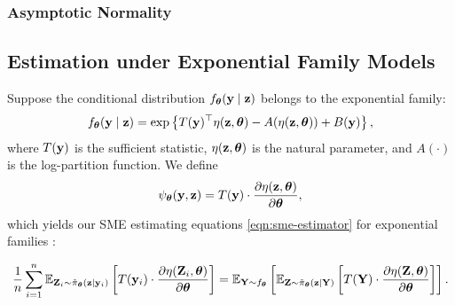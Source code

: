 \documentclass[twoside,11pt]{article}
\begin{document}
\subsubsection{Asymptotic Normality}

\subsection{Estimation under Exponential Family Models}
\label{sct:exponential-family}

Suppose the conditional distribution \( f_{\bm{\theta}}({\bf y} \mid {\bf z}) \) belongs to the exponential family:
\[
f_{\bm{\theta}}({\bf y} \mid {\bf z}) = \exp\left\{ T({\bf y})^\top \eta({\bf z}, {\bm{\theta}}) - A(\eta({\bf z}, {\bm{\theta}})) + B({\bf y}) \right\},
\]
where \( T({\bf y}) \) is the sufficient statistic, \( \eta({\bf z}, {\bm{\theta}}) \) is the natural parameter, and \( A(\cdot) \) is the log-partition function. We define
\begin{equation}
\psi_{\bm{\theta}}({\bf y}, {\bf z}) = T({\bf y}) \cdot \frac{\partial \eta({\bf z}, {\bm{\theta}})}{\partial {\bm{\theta}}},
\label{eqn:psi-expfam}
\end{equation}
%
which yields our SME estimating equations \eqref{eqn:sme-estimator} for exponential families :

\begin{tcolorbox}[colback=blue!3!white,colframe=blue!70!black,title=SME Exponential Family Estimating Equation]
\begin{equation}
\label{eqn:sme-expfam}
\frac{1}{n} \sum_{i=1}^n 
\mathbb{E}_{{\bf Z}_i\sim\tilde\pi_{\bm{\theta}}({\bf z} \mid {\bf y}_i)} 
\left[
T({\bf y}_i) \cdot 
\frac{\partial \eta({\bf Z}_i, {\bm{\theta}})}{\partial {\bm{\theta}}}
\right]
=
\mathbb{E}_{{\bf Y} \sim f_{\bm{\theta}}}
\left[
\mathbb{E}_{{\bf Z}\sim\tilde\pi_{\bm{\theta}}({\bf z} \mid {\bf Y})} 
\left[ 
T({\bf Y}) \cdot 
\frac{\partial \eta({\bf Z}, {\bm{\theta}})}{\partial {\bm{\theta}}}
\right]
\right].
\end{equation}
\end{tcolorbox}
\end{document}
